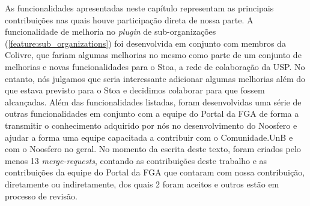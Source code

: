 As funcionalidades apresentadas neste capítulo representam as principais
contribuições nas quais houve participação direta de nossa parte. A
funcionalidade de melhoria no \textit{plugin} de sub-organizações
(\ref{feature:sub_organizations}) foi desenvolvida em conjunto com membros
da Colivre, que fariam algumas melhorias no mesmo como parte de um conjunto de
melhorias e novas funcionalidades para o Stoa, a rede de colaboração da USP.
%
No entanto, nós julgamos que seria interessante adicionar algumas melhorias
além do que estava previsto para o Stoa e decidimos colaborar para que fossem
alcançadas.
%
Além das funcionalidades listadas, foram desenvolvidas uma série de outras
funcionalidades em conjunto com a equipe do Portal da FGA de forma a
transmitir o conhecimento adquirido por nós no desenvolvimento do Noosfero
e ajudar a forma uma equipe capacitada a contribuir com o Comunidade.UnB
e com o Noosfero no geral. No momento da escrita deste texto, foram criados
pelo menos 13 \textit{merge-requests}, contando as contribuições deste trabalho
e as contribuições da equipe do Portal da FGA que contaram com nossa contribuição,
diretamente ou indiretamente, dos quais 2 foram aceitos e outros estão em
processo de revisão.

